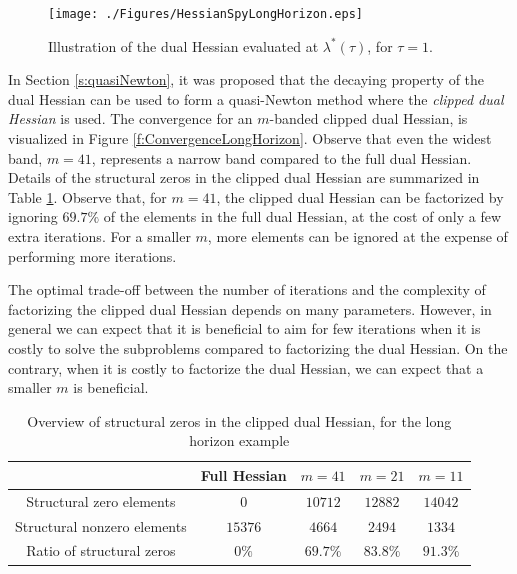 \begin{figure}[h]
\centering
\texttt{[image: ./Figures/HessianSpyLongHorizon.eps]}
\caption{Illustration of the dual Hessian evaluated at $\lambda^*(\tau)$, for $\tau=1$.}
\label{f:SpyLongHorizon}
\end{figure}

In Section \ref{s:quasiNewton}, it was proposed that the decaying property of the dual Hessian can be used to form a quasi-Newton method where the \emph{clipped dual Hessian} is used. The convergence for an $m$-banded clipped dual Hessian, is visualized in Figure \ref{f:ConvergenceLongHorizon}. Observe that even the widest band, $m=41$, represents a narrow band compared to the full dual Hessian. Details of the structural zeros in the clipped dual Hessian are summarized in Table \ref{t:StructureLongHorizon}. Observe that, for $m=41$, the clipped dual Hessian can be factorized by ignoring $69.7 \%$ of the elements in the full dual Hessian, at the cost of only a few extra iterations. For a smaller $m$, more elements can be ignored at the expense of performing more iterations. 

The optimal trade-off between the number of iterations and the complexity of factorizing the clipped dual Hessian depends on many parameters. However, in general we can expect that it is beneficial to aim for few iterations when it is costly to solve the subproblems compared to factorizing the dual Hessian. On the contrary, when it is costly to factorize the dual Hessian, we can expect that a smaller $m$ is beneficial.

\begin{table}[h]
\centering
\caption{Overview of structural zeros in the clipped dual Hessian, for the long horizon example}
\begin{tabular}{c|cccc} \label{t:StructureLongHorizon}
 & Full Hessian & $m=41$ & $m=21$ & $m=11$ \\
 \hline \hline
 Structural zero elements & $0$ & $10712$ & $12882$ & $14042$ \\
 Structural nonzero elements & $15376$ & $4664$ & $2494$ & $1334$ \\
 \hline 
 Ratio of structural zeros & $0\%$ & $69.7\%$ & $83.8\%$ & $91.3\%$ \\ 
\end{tabular}
\end{table}

